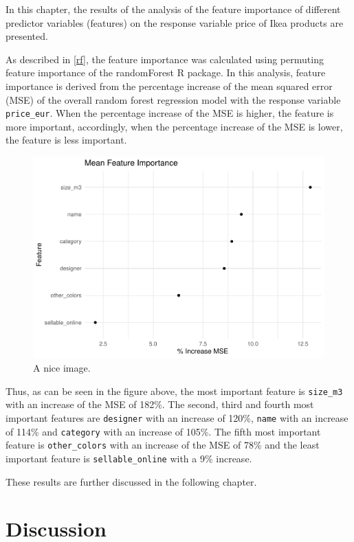 \documentclass[a4paper, nobind]{templates/ociamthesis}
\begin{document}
In this chapter, the results of the analysis of the feature importance of different predictor variables (features) on the response variable price of Ikea products are presented.

As described in \ref{rf}, the feature importance was calculated using permuting feature importance of the randomForest R package. In this analysis, feature importance is derived from the percentage increase of the mean squared error (MSE) of the overall random forest regression model with the response variable \texttt{price\_eur}. When the percentage increase of the MSE is higher, the feature is more important, accordingly, when the percentage increase of the MSE is lower, the feature is less important.

\begin{figure}
\includegraphics[width=0.9\linewidth]{_main_files/figure-latex/unnamed-chunk-4-1} \caption{A nice image.}\label{fig:unnamed-chunk-4}
\end{figure}

Thus, as can be seen in the figure above, the most important feature is \texttt{size\_m3} with an increase of the MSE of 182\%. The second, third and fourth most important features are \texttt{designer} with an increase of 120\%, \texttt{name} with an increase of 114\% and \texttt{category} with an increase of 105\%. The fifth most important feature is \texttt{other\_colors} with an increase of the MSE of 78\% and the least important feature is \texttt{sellable\_online} with a 9\% increase.

These results are further discussed in the following chapter.

\hypertarget{discussion}{%
\chapter{Discussion}\label{discussion}}
\end{document}
